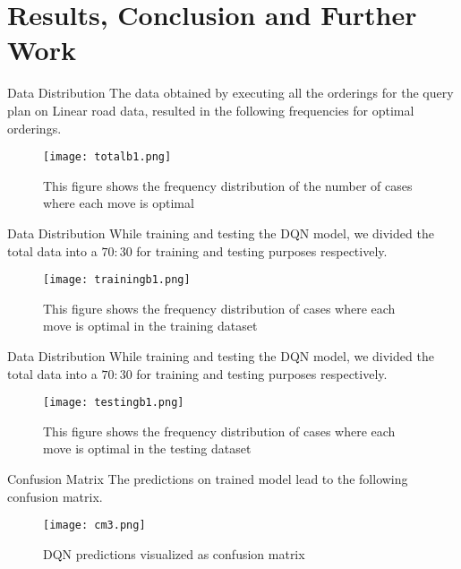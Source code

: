 
\section{Results, Conclusion and Further Work}
\frame{\sectionpage}

\begin{frame}{Data Distribution}
    The data obtained by executing all the orderings for the query plan on Linear road data, resulted in the following frequencies for optimal orderings.
    \begin{figure}
        \centering
        \texttt{[image: totalb1.png]}\\
        \caption{This figure shows the frequency distribution of the number of cases where each move is optimal}
        \label{fig:totalb1}
    \end{figure}
\end{frame}


\begin{frame}{Data Distribution}
    While training and testing the DQN model, we divided the total data into a $70:30$ for training and testing purposes respectively.
    \begin{figure}
        \centering
        \texttt{[image: trainingb1.png]}\\
        \caption{This figure shows the frequency distribution of cases where each move is optimal in the training dataset}
        \label{fig:trainingb1}
    \end{figure}
\end{frame}

\begin{frame}{Data Distribution}
    While training and testing the DQN model, we divided the total data into a $70:30$ for training and testing purposes respectively.
    \begin{figure}
        \centering
        \texttt{[image: testingb1.png]}\\
        \caption{This figure shows the frequency distribution of cases where each move is optimal in the testing dataset}
        \label{fig:testingb1}
    \end{figure}
\end{frame}


\begin{frame}{Confusion Matrix}
    The predictions on trained model lead to the following confusion matrix.
    \begin{figure}
        \centering
        \texttt{[image: cm3.png]}\\
        \caption{DQN predictions visualized as confusion matrix}
        \label{fig:dqn_r2_1}
    \end{figure}
\end{frame}

